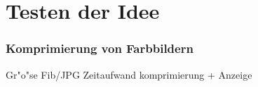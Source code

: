%
%
%
%

\newpage
\part{Testen der Idee}
\label{partTestFib}


\section{Komprimierung von Farbbildern}

Gr"o"se Fib/JPG
Zeitaufwand komprimierung + Anzeige